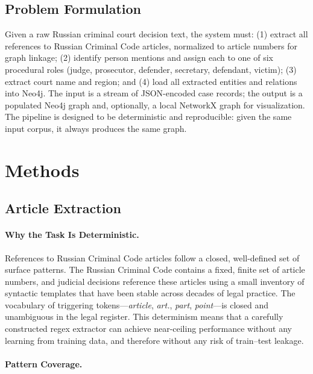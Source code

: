 \documentclass[11pt]{article}
\begin{document}
\subsection{Problem Formulation}

Given a raw Russian criminal court decision text, the system must: (1) extract all references to Russian Criminal Code articles, normalized to article numbers for graph linkage; (2) identify person mentions and assign each to one of six procedural roles (judge, prosecutor, defender, secretary, defendant, victim); (3) extract court name and region; and (4) load all extracted entities and relations into Neo4j. The input is a stream of JSON-encoded case records; the output is a populated Neo4j graph and, optionally, a local NetworkX graph for visualization. The pipeline is designed to be deterministic and reproducible: given the same input corpus, it always produces the same graph.

\section{Methods}

\subsection{Article Extraction}

\paragraph{Why the Task Is Deterministic.}

References to Russian Criminal Code articles follow a closed, well-defined set of surface patterns. The Russian Criminal Code contains a fixed, finite set of article numbers, and judicial decisions reference these articles using a small inventory of syntactic templates that have been stable across decades of legal practice. The vocabulary of triggering tokens---\textit{article}, \textit{art.}, \textit{part}, \textit{point}---is closed and unambiguous in the legal register. This determinism means that a carefully constructed regex extractor can achieve near-ceiling performance without any learning from training data, and therefore without any risk of train--test leakage.

\paragraph{Pattern Coverage.}
\end{document}
